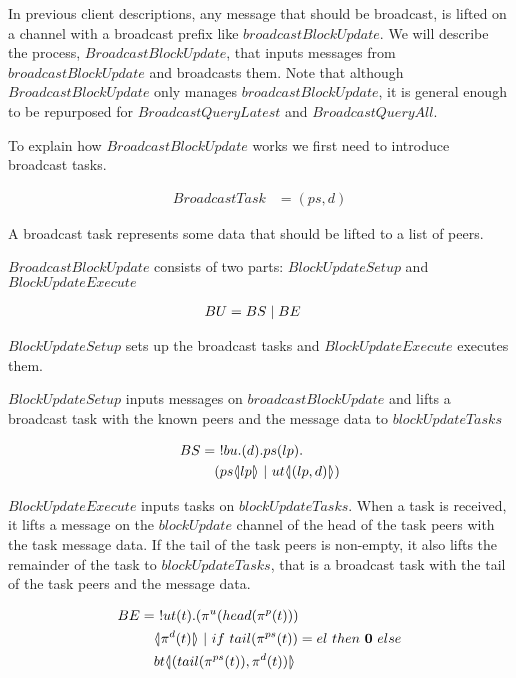 In previous client descriptions, any message that should be broadcast, is lifted on a channel with a broadcast prefix like $broadcastBlockUpdate$.
We will describe the process, $BroadcastBlockUpdate$, that inputs messages from $broadcastBlockUpdate$ and broadcasts them.
Note that although $BroadcastBlockUpdate$ only manages $broadcastBlockUpdate$, it is general enough to be repurposed for $BroadcastQueryLatest$ and $BroadcastQueryAll$.

To explain how $BroadcastBlockUpdate$ works we first need to introduce broadcast tasks.

\begin{align*}
    BroadcastTask &= (ps, d)
\end{align*}

A broadcast task represents some data that should be lifted to a list of peers.

$BroadcastBlockUpdate$ consists of two parts: $BlockUpdateSetup$ and $BlockUpdateExecute$

\begin{align*}
    BU &= BS \mid BE
\end{align*}

$BlockUpdateSetup$ sets up the broadcast tasks and $BlockUpdateExecute$ executes them.

$BlockUpdateSetup$ inputs messages on $broadcastBlockUpdate$ and lifts a broadcast task with the known peers and the message data to $blockUpdateTasks$

\begin{align*}
    BS &=\ !bu.(d).ps(lp).\\
    &\quad (ps \langle \! | lp | \! \rangle\ |\ ut \langle \! | (lp,d) | \! \rangle)
\end{align*}

$BlockUpdateExecute$ inputs tasks on $blockUpdateTasks$.
When a task is received, it lifts a message on the $blockUpdate$ channel of the head of the task peers with the task message data.
If the tail of the task peers is non-empty, it also lifts the remainder of the task to $blockUpdateTasks$, that is a broadcast task with the tail of the task peers and the message data.

\begin{align*}
    BE &=\ !ut(t).(\pi^{u}(head(\pi^{p}(t)))\\
    &\quad \lift{}{\pi^{d}(t)}\ |\ if\ tail(\pi^{ps}(t))=el\ then\ \nil\ else\\
    &\quad bt\lift{}{(tail(\pi^{ps}(t)),\pi^{d}(t))}
\end{align*}
